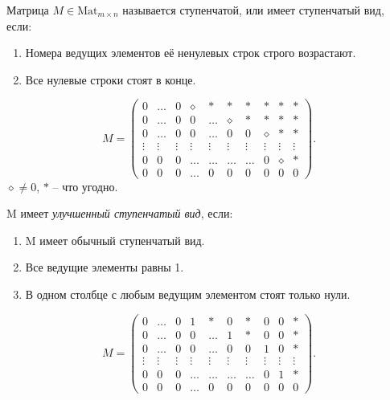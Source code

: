 \begin{definition}
    Матрица $M \in \text{Mat}_{m \times n}$ называется ступенчатой, или имеет ступенчатый вид, если:
    \begin{enumerate}
    \item Номера ведущих элементов её ненулевых строк строго возрастают.
    \item Все нулевые строки стоят в конце.
    \end{enumerate}
\end{definition}
\begin{equation*}
    M = \begin{pmatrix}
        0 & \dots & 0 & \diamond & * & * & * & * & * & * \\
        0 & \dots & 0 & 0 & \dots & \diamond & * & * & * & * \\
        0 & \dots & 0 & 0 & \dots & 0 & 0 & \diamond & * & * \\
        \vdots & \vdots & \vdots & \vdots & \vdots & \vdots & \vdots & \vdots & \vdots & \vdots \\
        0 & 0 & 0 & \dots & \dots & \dots & \dots & 0 & \diamond & * \\
        0 & 0 & 0 & \dots & 0 & 0 & 0 & 0 & 0 & 0
    \end{pmatrix}
.\end{equation*}
$\diamond \neq 0$, $*$ -- что угодно. 

\begin{definition}
    M имеет \textit{улучшенный ступенчатый вид}, если:

    \begin{enumerate}
    \item M имеет обычный ступенчатый вид.
    \item Все ведущие элементы равны 1.
    \item В одном столбце с любым ведущим элементом стоят только нули.
    \end{enumerate}
\end{definition}

\begin{equation*}
    M = \begin{pmatrix}
        0 & \dots & 0 & 1 & * & 0 & * & 0 & 0 & * \\
        0 & \dots & 0 & 0 & \dots & 1 & * & 0 & 0 & * \\
        0 & \dots & 0 & 0 & \dots & 0 & 0 & 1 & 0 & * \\
        \vdots & \vdots & \vdots & \vdots & \vdots & \vdots & \vdots & \vdots & \vdots & \vdots \\
        0 & 0 & 0 & \dots & \dots & \dots & \dots & 0 & 1 & * \\
        0 & 0 & 0 & \dots & 0 & 0 & 0 & 0 & 0 & 0
    \end{pmatrix}
.\end{equation*}

